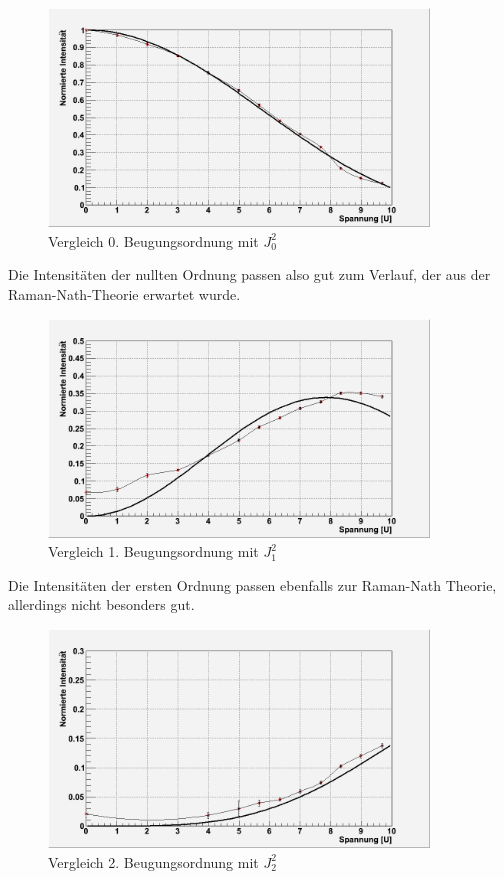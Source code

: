 \begin{figure}[H]
 \includegraphics[width=0.9\textwidth]{Bilder/raman/raman-fit_0.png}
 \caption{Vergleich 0. Beugungsordnung mit $J_0^2$}
\end{figure}
Die Intensitäten der nullten Ordnung passen also gut zum Verlauf, der aus der Raman-Nath-Theorie erwartet wurde.
\begin{figure}[H]
 \includegraphics[width=0.9\textwidth]{Bilder/raman/raman-fit_1.png}
 \caption{Vergleich 1. Beugungsordnung mit $J_1^2$}
\end{figure}
Die Intensitäten der ersten Ordnung passen ebenfalls zur Raman-Nath Theorie, allerdings nicht besonders gut.
\begin{figure}[H]
 \includegraphics[width=0.9\textwidth]{Bilder/raman/raman-fit_2.png}
 \caption{Vergleich 2. Beugungsordnung mit $J_2^2$}
\end{figure}
